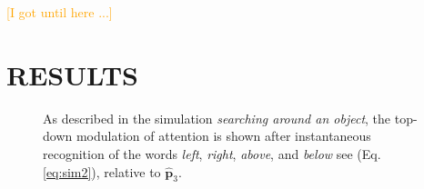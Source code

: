 \documentclass[letterpaper, 10 pt, conference]{ieeeconf}  %
\begin{document}
	\textcolor{orange}{[I got until here ...]}
		
%		
	\section{RESULTS}
	\label{sec:results}

	\begin{figure}[h!]
		\begin{center}
			
		\end{center}
		\caption{As described in the simulation \textit{searching around an object}, the top-down modulation of attention is shown after instantaneous recognition of the words \textit{left}, \textit{right}, \textit{above}, and \textit{below} see (Eq. \eqref{eq:sim2}), relative to $\mathbf{\hat{p}}_3$.}
	\label{fig:sim2}
	\end{figure}
\end{document}
